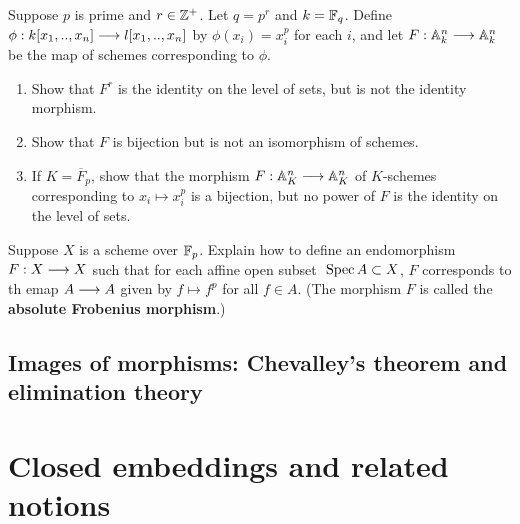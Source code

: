 \documentclass[11pt]{book} %
\begin{document}
\begin{exr}
Suppose $p$ is prime and $r\in \mathbb Z^+$. Let $q=p^r$ and $k=\mathbb F_q$. Define $\phi:k[x_1,..,x_n]\longrightarrow l[x_1,..,x_n] $ by $\phi(x_i)=x_i^p$ for each $i$, and let $F:\mathbb A^n_k\longrightarrow \mathbb A^n_k$ be the map of schemes corresponding to $\phi$.
\begin{enumerate}[label=(\alph*)]
\item Show that $F^r$ is the identity on the level of sets, but is not the identity morphism.
\item Show that $F$ is bijection but is not an isomorphism of schemes.
\item If $K=\overline{F}_p$, show that the morphism $F:\mathbb A^n_K\longrightarrow \mathbb A^n_K$ of $K$-schemes corresponding to $x_i\mapsto x_i^p$ is a bijection, but no power of $F$ is the identity on the level of sets.
\end{enumerate}
\end{exr}
\begin{exr}
Suppose $X$ is a scheme over $\mathbb F_p$. Explain how to define an endomorphism $F:X\longrightarrow X$ such that for each affine open subset $\text{ Spec\,} A\subset X$, $F$ corresponds to th emap $A\longrightarrow A$ given by $f\mapsto f^p$ for all $f\in A$. (The morphism $F$ is called the \textbf{absolute Frobenius morphism}.)
\end{exr}
\section{Images of morphisms: Chevalley's theorem and elimination theory}
\chapter{Closed embeddings and related notions}
\end{document}
